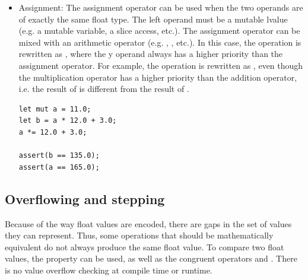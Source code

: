 \begin{itemize}
\item Assignment: The assignment operator \token{=} can be used when the two
  operands are of exactly the same float type. The left operand must be a
  mutable lvalue (e.g. a mutable variable, a slice access, etc.). The
  assignment operator can be mixed with an arithmetic operator (e.g.
  \token{+=}, \token{/=}, etc.). In this case, the operation 
  is rewritten as , where the y operand always has a higher
  priority than the assignment operator. For example, the operation  is rewritten as , even though the
  multiplication operator has a higher priority than the addition operator, i.e.
  the result of  is different from the result of
  .

  \begin{lstlisting}[style=coloredverbatim]
let mut a = 11.0;
let b = a * 12.0 + 3.0;
a *= 12.0 + 3.0;

assert(b == 135.0);
assert(a == 165.0);
  \end{lstlisting}

\end{itemize}

\subsection{Overflowing and stepping}

Because of the way float values are encoded, there are gaps in the set of values
they can represent. Thus, some operations that should be mathematically
equivalent do not always produce the same float value. To compare two float
values, the property  can be used, as well as the congruent
operators \token{<=>} and \token{<!>}. There is no value overflow checking
at compile time or runtime.

\vfill%
\pagebreak
